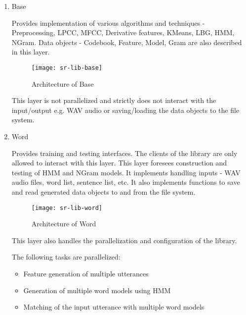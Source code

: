 \begin{enumerate}

\item Base

Provides implementation of various algorithms and techniques - Preprocessing, LPCC, MFCC, Derivative features, KMeans, LBG, HMM, NGram. Data objects - Codebook, Feature, Model, Gram are also described in this layer.

\begin{figure}[h!]
    \centering
    \texttt{[image: sr-lib-base]}
    \label{fig:sr-lib-base}
    \caption{Architecture of Base}
\end{figure}

This layer is not parallelized and strictly does not interact with the input/output e.g. WAV audio or saving/loading the data objects to the file system.

\newpage 

\item Word

Provides training and testing interfaces. The clients of the library are only allowed to interact with this layer.
This layer foresees construction and testing of HMM and NGram models. It implements handling inputs - WAV audio files, word list, sentence list, etc. It also implements functions to save and read generated data objects to and from the file system.

\begin{figure}[h!]
    \centering
    \texttt{[image: sr-lib-word]}
    \label{fig:sr-lib-word}
    \caption{Architecture of Word}
\end{figure}

This layer also handles the parallelization and configuration of the library.

The following tasks are parallelized:
\begin{itemize}
    \item Feature generation of multiple utterances
    \item Generation of multiple word models using HMM
    \item Matching of the input utterance with multiple word models
\end{itemize}


\end{enumerate}

